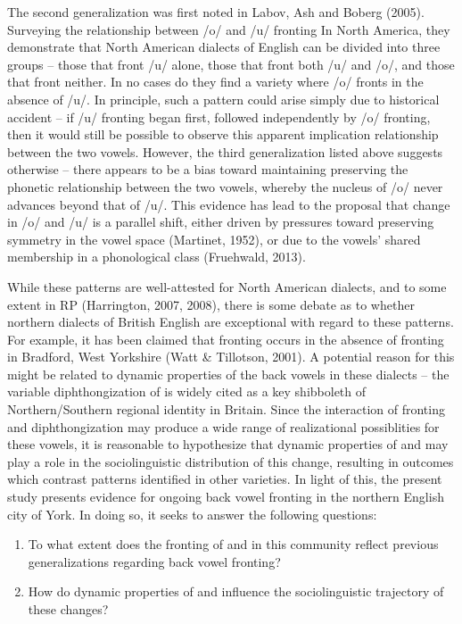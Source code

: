 \documentclass[12pt]{article}
\begin{document}
The second generalization was first noted in Labov, Ash and Boberg (2005). Surveying the relationship between /o/ and /u/ fronting In North America, they demonstrate that North American dialects of English can be divided into three groups -- those that front /u/ alone, those that front both /u/ and /o/, and those that front neither. In no cases do they find a variety where /o/ fronts in the absence of /u/. In principle, such a pattern could arise simply due to historical accident -- if /u/ fronting began first, followed independently by /o/ fronting, then it would still be possible to observe this apparent implication relationship between the two vowels. However, the third generalization listed above suggests otherwise -- there appears to be a bias toward maintaining preserving the phonetic relationship between the two vowels, whereby the nucleus of /o/ never advances beyond that of /u/. This evidence has lead to the proposal that change in /o/ and /u/ is a parallel shift, either driven by pressures toward preserving symmetry in the vowel space (Martinet, 1952), or due to the vowels' shared membership in a phonological class (Fruehwald, 2013).

While these patterns are well-attested for North American dialects, and to some extent in RP (Harrington, 2007, 2008), there is some debate as to whether northern dialects of British English are exceptional with regard to these patterns. For example, it has been claimed that  fronting occurs in the absence of  fronting in Bradford, West Yorkshire (Watt \& Tillotson, 2001). A potential reason for this might be related to dynamic properties of the back vowels in these dialects -- the variable diphthongization of  is widely cited as a key shibboleth of Northern/Southern regional identity in Britain. Since the interaction of fronting and diphthongization may produce a wide range of realizational possiblities for these vowels, it is reasonable to hypothesize that dynamic properties of  and  may play a role in the sociolinguistic distribution of this change, resulting in outcomes which contrast patterns identified in other varieties. In light of this, the present study presents evidence for ongoing back vowel fronting in the northern English city of York. In doing so, it seeks to answer the following questions:

\begin{enumerate}
\item{To what extent does the fronting of  and  in this community reflect previous generalizations regarding back vowel fronting?}
\item{How do dynamic properties of  and  influence the sociolinguistic trajectory of these changes?}
\end{enumerate}
\end{document}
